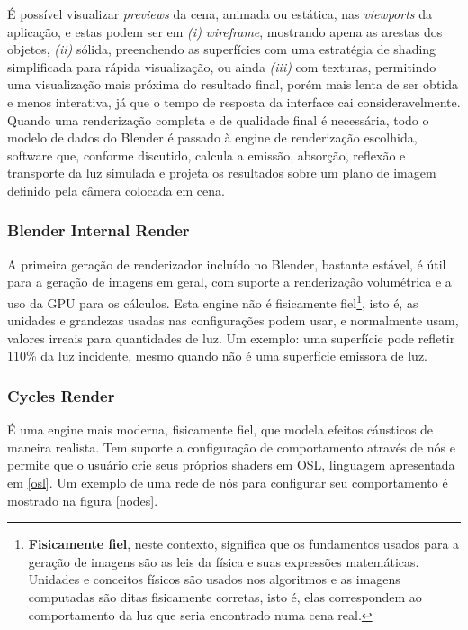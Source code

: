 \documentclass[12pt, a4paper, oneside]{book}
\begin{document}
É possível visualizar {\it previews} da cena, animada ou estática, nas {\it viewports} da aplicação, e estas podem ser em {\it (i)} {\it wireframe}, mostrando apena as arestas dos objetos, {\it (ii)} sólida, preenchendo as superfícies com uma estratégia de {\it} shading simplificada para rápida visualização, ou ainda {\it (iii)} com texturas, permitindo uma visualização mais próxima do resultado final, porém mais lenta de ser obtida e menos interativa, já que o tempo de resposta da interface cai consideravelmente. Quando uma renderização completa e de qualidade final é necessária, todo o modelo de dados do Blender é passado à engine de renderização escolhida, software que, conforme discutido, calcula a emissão, absorção, reflexão e transporte da luz simulada e projeta os resultados sobre um plano de imagem definido pela câmera colocada em cena.

\subsubsection{Blender Internal Render}

A primeira geração de renderizador incluído no Blender, bastante estável, é útil para a geração de imagens em geral, com suporte a renderização volumétrica e a uso da GPU para os cálculos. Esta engine não é fisicamente fiel\footnote{{\bf Fisicamente fiel}, neste contexto, significa que os fundamentos usados para a geração de imagens são as leis da física e suas expressões matemáticas. Unidades e conceitos físicos são usados nos algoritmos e as imagens computadas são ditas fisicamente corretas, isto é, elas correspondem ao comportamento da luz que seria encontrado numa cena real.}, isto é, as unidades e grandezas usadas nas configurações podem usar, e normalmente usam, valores irreais para quantidades de luz. Um exemplo: uma superfície pode refletir 110\% da luz incidente, mesmo quando não é uma superfície emissora de luz.

\subsubsection{Cycles Render}

É uma engine mais moderna, fisicamente fiel, que modela efeitos cáusticos de maneira realista. Tem suporte a configuração de comportamento através de nós e permite que o usuário crie seus próprios shaders em OSL, linguagem apresentada em \ref{osl}. Um exemplo de uma rede de nós para configurar seu comportamento é mostrado na figura \ref{nodes}. \\
\end{document}
